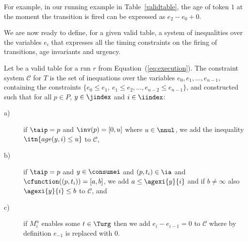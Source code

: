 For example, in our running example in Table~\ref{validtable},
the age of token $1$ at the moment the transition  is fired
can be expressed as $e_2 - e_0 + 0$.



We are now ready to define, for a given valid table, a system of inequalities
over the variables $e_i$ that expresses all the timing constraints on the 
firing of transitions, age invariants and urgency.
 
\begin{definition}\label{def:consys}
Let  be a valid table for a run $r$ from
Equation~(\ref{eq:execution}). The constraint system $\mathscr{C}$ for $T$ 
is the set of inequations over the variables
$e_0, e_1, \ldots, e_{n-1}$, containing the constraints 
$\{ e_0 \leq e_1,\ e_1 \leq e_2, \ldots, e_{n-2} \leq e_{n-1}\}$, 
and constructed 
such that for all $p \in P$, $y \in \jindex$ and $i \in \iindex$:
\begin{description}
\item[a)] if $\taip=p$ and $\inv(p)=[0,u]$ where $u \in \nnul$, 
we add the inequality $\itn{age(y,i)\leq u}$ to $\mathscr{C}$,
\item[b)] if $\taip=p$ and $y \in \consumei$ and $(p,t_i) \in \ia$ and $\cfunction((p,t_i))=[a,b]$, we add $a \leq \agexi{y}{i}$ and if $b \not=\infty$ also 
$\agexi{y}{i}\leq b$ to $\mathscr{C}$, and
\item[c)] if $M^u_i$ enables some $t \in \Turg$
then we add $e_i - e_{i-1} = 0$ to $\mathscr{C}$
where by definition $e_{-1}$ is replaced with $0$.
\end{description}
\end{definition}

